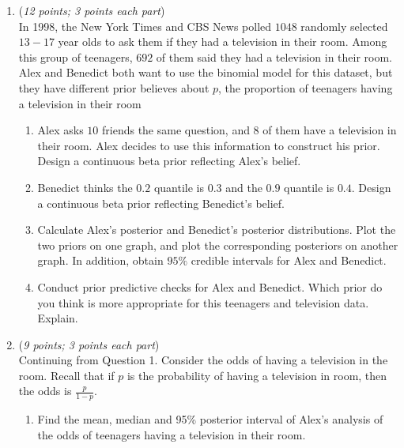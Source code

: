 \documentclass[11pt]{article}
\begin{document}
\begin{enumerate}


    \item
    ({\it{12 points; 3 points each part}}) \\
    In 1998, the New York Times and CBS News polled $1048$ randomly selected $13 - 17$ year olds to ask them if they had a television in their room. Among this group of teenagers, $692$ of them said they had a television in their room. Alex and Benedict both want to use the binomial model for this dataset, but they have different prior believes about $p$, the proportion of teenagers having a television in their room

\begin{enumerate}
\item Alex asks $10$ friends the same question, and $8$ of them have a television in their room. Alex decides to use this information  to construct his prior. Design a continuous beta prior reflecting Alex's belief.

\item Benedict thinks the $0.2$ quantile is $0.3$ and the $0.9$ quantile is $0.4$. Design a continuous beta prior reflecting Benedict's belief.

\item Calculate Alex's posterior and Benedict's posterior distributions. Plot the two priors on one graph, and plot the corresponding posteriors on another graph.  In addition, obtain  $95\%$ credible intervals for Alex and Benedict. 

\item Conduct prior predictive checks for Alex and Benedict. Which prior do you think is more appropriate for this teenagers and television data.  Explain.
\end{enumerate}

    \item
    ({\it{9 points; 3 points each part}}) \\
Continuing from Question 1. Consider the odds of having a television in the room. Recall that if $p$ is the probability of having a television in room, then the odds is $\frac{p}{1-p}$.

\begin{enumerate}
\item Find the mean, median and 95\% posterior interval of Alex's analysis of the odds of teenagers having a television in their room.


\end{enumerate}
\end{enumerate}
\end{document}
